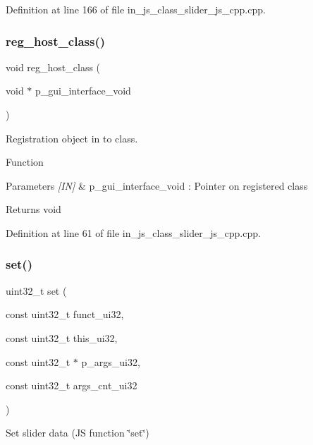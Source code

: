 Definition at line 166 of file in\+\_\+js\+\_\+class\+\_\+slider\+\_\+js\+\_\+cpp.\+cpp.

\mbox{\label{group___slider_gac715b4a43bb361fc96ce6f1b50d68a8b}} 
\subsubsection{reg\_host\_class()}
{\footnotesize\ttfamily void reg\+\_\+host\+\_\+class (\begin{DoxyParamCaption}\item[{void $\ast$}]{p\+\_\+gui\+\_\+interface\+\_\+void }\end{DoxyParamCaption})}



Registration object in to class. 

Function
\begin{DoxyParams}{Parameters}
{\em \mbox{[}\+I\+N\mbox{]}} & p\+\_\+gui\+\_\+interface\+\_\+void \+: Pointer on registered class \\
\hline
\end{DoxyParams}
\begin{DoxyReturn}{Returns}
void 
\end{DoxyReturn}


Definition at line 61 of file in\+\_\+js\+\_\+class\+\_\+slider\+\_\+js\+\_\+cpp.\+cpp.

\mbox{\label{group___slider_gaddd13ecddc86a2824924f6fd5a27cb74}} 
\subsubsection{set()}
{\footnotesize\ttfamily uint32\+\_\+t set (\begin{DoxyParamCaption}\item[{const uint32\+\_\+t}]{funct\+\_\+ui32,  }\item[{const uint32\+\_\+t}]{this\+\_\+ui32,  }\item[{const uint32\+\_\+t $\ast$}]{p\+\_\+args\+\_\+ui32,  }\item[{const uint32\+\_\+t}]{args\+\_\+cnt\+\_\+ui32 }\end{DoxyParamCaption})\hspace{0.3cm}{\ttfamily [static]}}



Set slider data (JS function \char`\"{}set\char`\"{}) 


